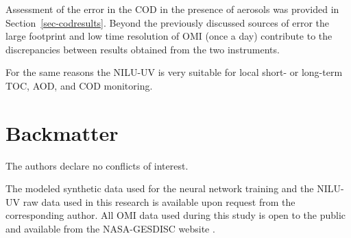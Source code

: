 \documentclass{optica-article}
\begin{document}
Assessment of the error in the COD in the presence of aerosols was provided in Section~\ref{sec-codresults}.
Beyond the previously discussed sources of error the large footprint and low time resolution of OMI (once a day) contribute to the discrepancies between results obtained from the two instruments.
 
For the same reasons the NILU-UV is very suitable for local short- or long-term TOC, AOD, and COD monitoring. 




\section{Backmatter}

\begin{backmatter}
	


The authors declare no conflicts of interest.

The modeled synthetic data used for the neural network training and the NILU-UV raw data used in this research is available upon request from the corresponding author. All OMI data used during this study is open to the public and available from the NASA-GESDISC website \cite{NASA:gesdisc}.

\end{backmatter}
\end{document}
